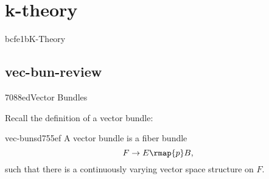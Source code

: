 \makeatletter{}\makeatother

\chapter{k-theory}{bcfe1b}{K-Theory}

\section{vec-bun-review}{7088ed}{Vector Bundles}

Recall the definition of a vector bundle:
\begin{defn}{vec-buns}{d755ef}
  A vector bundle is a fiber bundle 
  \[ F \to E \rmap{p} B, \]
  such that there is a continuously varying vector space structure on $F$. 
\end{defn}

